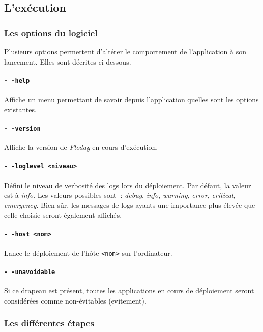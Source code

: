 \subsection{L'exécution}

\subsubsection{Les options du logiciel}

Plusieurs options permettent d'altérer le comportement de l'application à son lancement.
Elles sont décrites ci-dessous.

\paragraph{\tt-\,-help}
Affiche un menu permettant de savoir depuis l'application quelles sont les options existantes.

\paragraph{\tt-\,-version}
Affiche la version de \emph{Floday} en cours d'exécution.

\paragraph{\tt-\,-loglevel <niveau>}
Défini le niveau de verbosité des logs lors du déploiement.
Par défaut, la valeur est à \emph{info}. Les valeurs possibles sont~: \emph{debug}, \emph{info}, \emph{warning}, \emph{error}, \emph{critical}, \emph{emergency}.
Bien-sûr, les messages de logs ayants une importance plus élevée que celle choisie seront également affichés.

\paragraph{\tt-\,-host <nom>}
Lance le déploiement de l'hôte {\tt<nom>} sur l'ordinateur.

\paragraph{\tt-\,-unavoidable}
Si ce drapeau est présent, toutes les applications en cours de déploiement seront considérées comme non-évitables (\gls{evitement}).

\subsubsection{Les différentes étapes}

